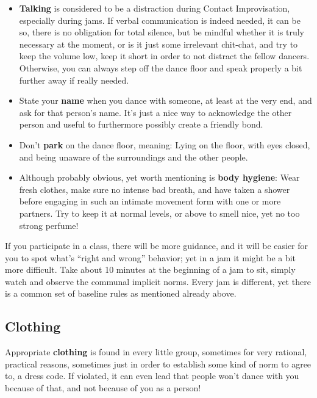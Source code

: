 \begin{itemize}
    \item \textbf{Talking} is considered to be a distraction during Contact Improvisation, especially during jams.
    If verbal communication is indeed needed, it can be so, there is no obligation for total silence, but be mindful whether it is truly necessary at the moment, or is it just some irrelevant chit-chat, and try to keep the volume low, keep it short in order to not distract the fellow dancers.
    Otherwise, you can always step off the dance floor and speak properly a bit further away if really needed.
    \item State your \textbf{name} when you dance with someone, at least at the very end, and ask for that person's name.
    It's just a nice way to acknowledge the other person and useful to furthermore possibly create a friendly bond.
    \item Don't \textbf{park} on the dance floor, meaning: Lying on the floor, with eyes closed, and being unaware of the surroundings and the other people.
    \item Although probably obvious, yet worth mentioning is \textbf{body hygiene}: Wear fresh clothes, make sure no intense bad breath, and have taken a shower before engaging in such an intimate movement form with one or more partners.
    Try to keep it at normal levels, or above to smell nice, yet no too strong perfume!
\end{itemize}

If you participate in a class, there will be more guidance, and it will be easier for you to spot what's ``right and wrong'' behavior; yet in a jam it might be a bit more difficult.
Take about 10 minutes at the beginning of a jam to sit, simply watch and observe the communal implicit norms.
Every jam is different, yet there is a common set of baseline rules as mentioned already above.

\subsection{Clothing}\label{subsec:clothing}

Appropriate \textbf{clothing} is found in every little group, sometimes for very rational, practical reasons, sometimes just in order to establish some kind of norm to agree to, a dress code.
If violated, it can even lead that people won't dance with you because of that, and not because of you as a person!

